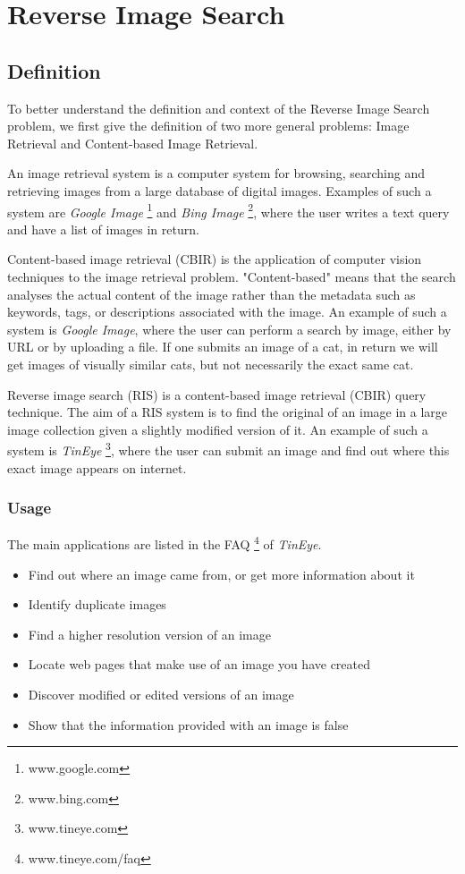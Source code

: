 \chapter{Reverse Image Search}

\label{chapter:ReverseImageSearch}


\section{Definition}
To better understand the definition and context of the Reverse Image Search problem, we first give the definition of two more general problems: Image Retrieval and Content-based Image Retrieval.

An image retrieval system is a computer system for browsing, searching and retrieving images from a large database of digital images. \cite{wiki:Image_retrieval} Examples of such a system are \textit{Google Image} \footnote{www.google.com} and \textit{Bing Image} \footnote{www.bing.com}, where the user writes a text query and have a list of images in return.

Content-based image retrieval (CBIR) is the application of computer vision techniques to the image retrieval problem. "Content-based" means that the search analyses the actual content of the image rather than the metadata such as keywords, tags, or descriptions associated with the image. \cite{wiki:Content-based_image_retrieval} An example of such a system is \textit{Google Image}, where the user can perform a search by image, either by URL or by uploading a file. If one submits an image of a cat, in return we will get images of visually similar cats, but not necessarily the exact same cat.

Reverse image search (RIS) is a content-based image retrieval (CBIR) query technique. The aim of a RIS system is to find the original of an image in a large image collection given a slightly modified version of it. An example of such a system is \textit{TinEye} \footnote{www.tineye.com}, where the user can submit an image and find out where this exact image appears on internet.

\subsection{Usage}
The main applications are listed in the FAQ \footnote{www.tineye.com/faq} of \textit{TinEye}.

\begin{itemize}
\item Find out where an image came from, or get more information about it
\item Identify duplicate images
\item Find a higher resolution version of an image
\item Locate web pages that make use of an image you have created
\item Discover modified or edited versions of an image
\item Show that the information provided with an image is false
\end{itemize}

